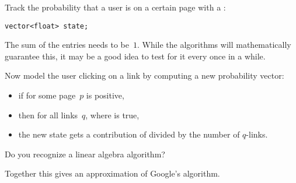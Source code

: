 \begin{exercise}
  Track the probability that a user is on a certain page with a
  :
\begin{verbatim}
vector<float> state;
\end{verbatim}
  The sum of the entries needs to be~$1$. While the algorithms will
  mathematically guarantee this, it may be a good idea to test for it
  every once in a while.

  Now model the user clicking on a link by computing a new probability
  vector:
  \begin{itemize}
  \item if for some page~$p$  is positive,
  \item then for all links~$q$, where  is true,
  \item the new state gets a contribution of  divided by
    the number of $q$-links.
  \end{itemize}
  Do you recognize a linear algebra algorithm?
\end{exercise}

Together this gives an approximation of Google's 
algorithm.
